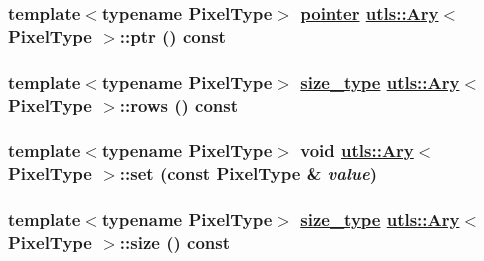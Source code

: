 \hypertarget{structutls_1_1Ary_cddfbaf22b3c0ccad8a31cf2534dbb9b}{
\subsubsection[ptr]{\setlength{\rightskip}{0pt plus 5cm}template$<$typename Pixel\-Type$>$ \hyperlink{structutls_1_1Ary_9eb735fe995ca9b5faaef9b176a08583}{pointer} \hyperlink{structutls_1_1Ary}{utls::Ary}$<$ Pixel\-Type $>$::ptr () const}}
\label{structutls_1_1Ary_cddfbaf22b3c0ccad8a31cf2534dbb9b}


\hypertarget{structutls_1_1Ary_5e872410be8ad5d9a8fb529260c37f9f}{
\subsubsection[rows]{\setlength{\rightskip}{0pt plus 5cm}template$<$typename Pixel\-Type$>$ \hyperlink{structutls_1_1Ary_8811de4f35f83e989511aaddf003376c}{size\_\-type} \hyperlink{structutls_1_1Ary}{utls::Ary}$<$ Pixel\-Type $>$::rows () const}}
\label{structutls_1_1Ary_5e872410be8ad5d9a8fb529260c37f9f}


\hypertarget{structutls_1_1Ary_5033e49743bcf59db9b4edc9a3102c58}{
\subsubsection[set]{\setlength{\rightskip}{0pt plus 5cm}template$<$typename Pixel\-Type$>$ void \hyperlink{structutls_1_1Ary}{utls::Ary}$<$ Pixel\-Type $>$::set (const Pixel\-Type \& {\em value})}}
\label{structutls_1_1Ary_5033e49743bcf59db9b4edc9a3102c58}


\hypertarget{structutls_1_1Ary_3889fe21871116ca89694757b82575b6}{
\subsubsection[size]{\setlength{\rightskip}{0pt plus 5cm}template$<$typename Pixel\-Type$>$ \hyperlink{structutls_1_1Ary_8811de4f35f83e989511aaddf003376c}{size\_\-type} \hyperlink{structutls_1_1Ary}{utls::Ary}$<$ Pixel\-Type $>$::size () const}}
\label{structutls_1_1Ary_3889fe21871116ca89694757b82575b6}





